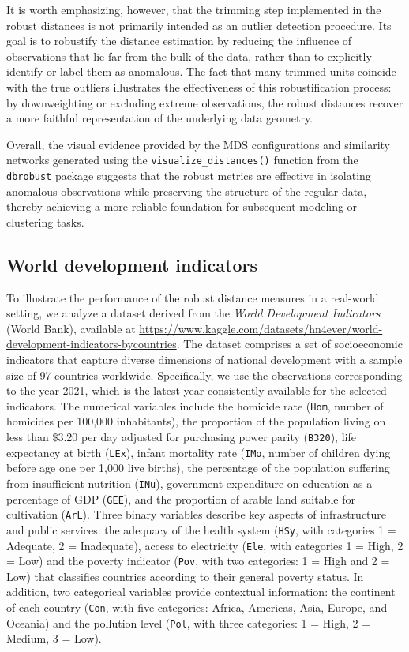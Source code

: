 It is worth emphasizing, however, that the trimming step implemented in the robust distances is not primarily intended as an outlier detection procedure. Its goal is to robustify the distance estimation by reducing the influence of observations that lie far from the bulk of the data, rather than to explicitly identify or label them as anomalous. The fact that many trimmed units coincide with the true outliers illustrates the effectiveness of this robustification process: by downweighting or excluding extreme observations, the robust distances recover a more faithful representation of the underlying data geometry.

Overall, the visual evidence provided by the MDS configurations and similarity networks generated using the \texttt{visualize\_distances()} function from the \texttt{dbrobust} package suggests that the robust metrics are effective in isolating anomalous observations while preserving the structure of the regular data, thereby achieving a more reliable foundation for subsequent modeling or clustering tasks.

\subsection{World development indicators}

To illustrate the performance of the robust distance measures in a real-world setting, we analyze a dataset derived from the \textit{World Development Indicators} (World Bank), available at {\small \url{https://www.kaggle.com/datasets/hn4ever/world-development-indicators-bycountries}}. The dataset comprises a set of socioeconomic indicators that capture diverse dimensions of national development with a sample size of 97 countries worldwide. Specifically, we use the observations corresponding to the year 2021, which is the latest year consistently available for the selected indicators. The numerical variables include the homicide rate (\texttt{Hom}, number of homicides per 100,000 inhabitants), the proportion of the population living on less than \$3.20 per day adjusted for purchasing power parity (\texttt{B320}), life expectancy at birth (\texttt{LEx}), infant mortality rate (\texttt{IMo}, number of children dying before age one per 1,000 live births), the percentage of the population suffering from insufficient nutrition (\texttt{INu}), government expenditure on education as a percentage of GDP (\texttt{GEE}), and the proportion of arable land suitable for cultivation (\texttt{ArL}).
Three binary variables describe key aspects of infrastructure and public services: the adequacy of the health system (\texttt{HSy}, with categories 1 = Adequate, 2 = Inadequate), access to electricity (\texttt{Ele}, with categories 1 = High, 2 = Low) and the poverty indicator (\texttt{Pov}, with two categories: 1 = High and 2 = Low) that classifies countries according to their general poverty status.
In addition, two categorical variables provide contextual information: the continent of each country (\texttt{Con}, with five categories: Africa, Americas, Asia, Europe, and Oceania) and the pollution level (\texttt{Pol}, with three categories: 1 = High, 2 = Medium, 3 = Low).

